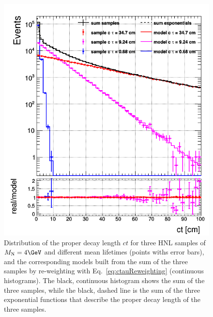 \begin{figure}[h!]
  \centering
  \includegraphics[width = .5\textwidth]{Figures/c4/reweighting/ctau_genLevel_unskimmed.png}
  \caption{Distribution of the proper decay length $ct$ for three HNL
    samples of $\mhnl=4\GeV$ and different mean lifetimes (points withs
    error bars),
    and the corresponding models built from the sum of the three
    samples by re-weighting with Eq.~\ref{eq:ctauReweighting}
    (continuous histograms). The black, continuous histogram shows the
    sum of the three samples, while the black, dashed line is the sum
    of the three exponential functions that describe the proper decay
    length of the three samples. \dani}
  \label{fig:newReweightGen}
\end{figure}
